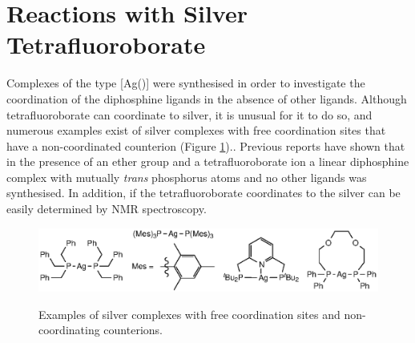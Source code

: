 
\section{Reactions with Silver Tetrafluoroborate}

Complexes of the type [Ag(\tBuxantphos)] were synthesised in order to investigate the coordination of the diphosphine ligands in the absence of other ligands.  Although tetrafluoroborate can coordinate to silver, it is unusual for it to do so,  and numerous examples exist of silver complexes with free coordination sites that have a non-coordinated  counterion (Figure \ref{Linearsilver}).\cite{Ainscough2011, Bayler1996, Vlugt2009b}.  Previous reports have shown that in the presence of an ether group and a tetrafluoroborate ion a linear diphosphine complex with mutually \emph{trans} phosphorus atoms and no other ligands was synthesised.\cite{Heuer2000}  In addition, if the tetrafluoroborate coordinates to the silver can be easily determined by \fluorine{} NMR spectroscopy.

\begin{figure}[htbp]
\begin{center}
\vspace{0.5cm}
\includegraphics{../Figures/Linearsilvercomplexes.eps}
\caption[Silver complexes with free coordination sites and  counterions]{Examples of silver complexes with free coordination sites and non-coordinating  counterions.}
\vspace{0.2cm}
\label{Linearsilver}
\vspace{0.2cm}
\end{center}
\end{figure}
\vspace{0.2cm}

